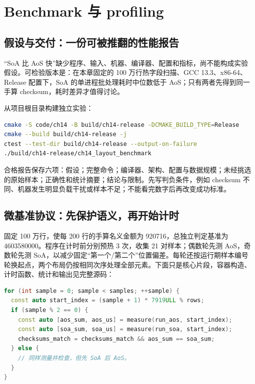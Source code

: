\chapter{Benchmark 与 profiling}


\section{假设与交付：一份可被推翻的性能报告}

“SoA 比 AoS 快”缺少程序、输入、机器、编译器、配置和指标，尚不能构成实验假设。可检验版本是：在本章固定的 100 万行热字段扫描、GCC 13.3、x86-64、Release 配置下，SoA 的单进程批处理耗时中位数低于 AoS；只有两者先得到同一手算 checksum，耗时差异才值得讨论。

从项目根目录构建独立实验：

\begin{lstlisting}[language=bash,numbers=none]
cmake -S code/ch14 -B build/ch14-release -DCMAKE_BUILD_TYPE=Release
cmake --build build/ch14-release -j
ctest --test-dir build/ch14-release --output-on-failure
./build/ch14-release/ch14_layout_benchmark
\end{lstlisting}

合格报告保存六项：假设；完整命令；编译器、架构、配置与数据规模；未经挑选的原始样本；正确性和统计摘要；结论与限制。先写判负条件，例如 checksum 不同、机器发生明显负载干扰或样本不足；不能看完数字后再改变成功标准。

\section{微基准协议：先保护语义，再开始计时}

 固定 100 万行，使每 200 行的手算名义金额为 920716，总独立判定基准为 4603580000。程序在计时前分别预热 3 次，收集 21 对样本；偶数轮先测 AoS，奇数轮先测 SoA，以减少固定“第一个/第二个”位置偏差。每轮还按运行期样本编号轮换起点，两个布局仍按相同次序处理全部元素。下面只是核心片段，容器构造、计时函数、统计和输出见完整源码：

\begin{lstlisting}[language=C++,numbers=none]
for (int sample = 0; sample < samples; ++sample) {
  const auto start_index = (sample + 1) * 7919ULL % rows;
  if (sample % 2 == 0) {
    const auto [aos_sum, aos_us] = measure(run_aos, start_index);
    const auto [soa_sum, soa_us] = measure(run_soa, start_index);
    checksums_match = checksums_match && aos_sum == soa_sum;
  } else {
    // 同样测量并检查，但先 SoA 后 AoS。
  }
}
\end{lstlisting}

